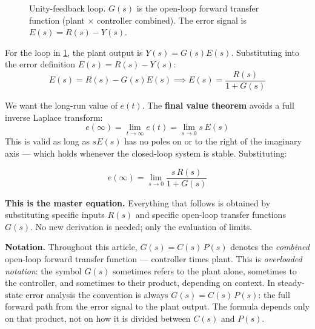 \documentclass[../../book.tex]{subfiles}
\begin{document}
\begin{figure}[htbp]
\centering
{}
\caption{Unity-feedback loop.  $G(s)$ is the open-loop forward transfer function
  (plant $\times$ controller combined).  The error signal is $E(s) = R(s) - Y(s)$.}
\label{fig:unity_fb}
\end{figure}

For the loop in \cref{fig:unity_fb}, the plant output is $Y(s) = G(s)E(s)$.
Substituting into the error definition $E(s) = R(s) - Y(s)$:
\[
  E(s) = R(s) - G(s)E(s)
  \implies
  E(s) = \frac{R(s)}{1 + G(s)}
\]

We want the long-run value of $e(t)$.  The \textbf{final value theorem} avoids
a full inverse Laplace transform:
\[
  e(\infty) = \lim_{t \to \infty} e(t) = \lim_{s \to 0} s\,E(s)
\]
This is valid as long as $sE(s)$ has no poles on or to the right of the
imaginary axis --- which holds whenever the closed-loop system is stable.
Substituting:

\begin{equation}
  \boxed{e(\infty) = \lim_{s \to 0} \frac{s\,R(s)}{1 + G(s)}}
  \label{eq:ess_general}
\end{equation}

\textbf{This is the master equation.}  Everything that follows is obtained by
substituting specific inputs $R(s)$ and specific open-loop transfer functions
$G(s)$.  No new derivation is needed; only the evaluation of limits.

\textbf{Notation.}  Throughout this article, $G(s) = C(s)\,P(s)$ denotes the
\emph{combined} open-loop forward transfer function --- controller times plant.
This is \emph{overloaded notation}: the symbol $G(s)$ sometimes refers to the
plant alone, sometimes to the controller, and sometimes to their product,
depending on context.  In steady-state error analysis the convention is always
$G(s) = C(s)\,P(s)$: the full forward path from the error signal to the plant
output.  The formula depends only on that product, not on how it is divided
between $C(s)$ and $P(s)$.
\end{document}
